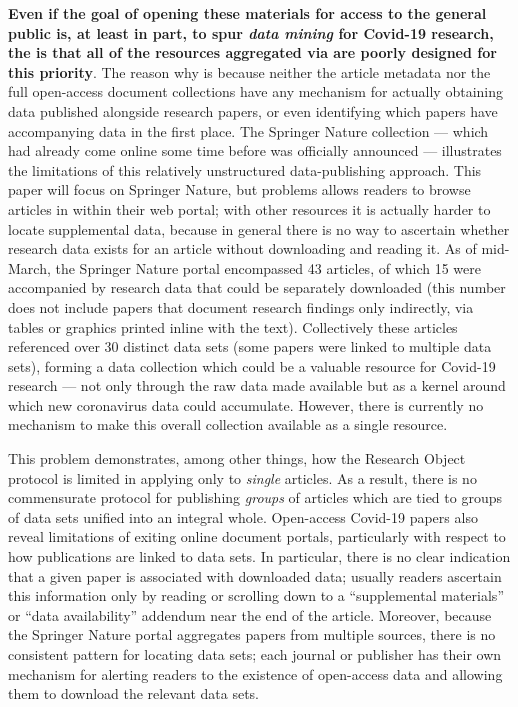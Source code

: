 \documentclass[11pt,letterpaper]{article}
\newcommand{\textscc}[1]{{\color{orr!35!black}{{%
						\fontfamily{Cabin-TLF}\fontseries{b}\selectfont{\textsc{\scriptsize{#1}}}}}}}
\newcommand{\AcronymText}[1]{{\textscc{#1}}}
\newcommand{\Cnineteen}{\resizebox{!}{7pt}{\AcronymText{CORD-19}}}
\newcommand{\HTML}{\resizebox{!}{7pt}{\AcronymText{HTML}}}
\newcommand{\p}[1]{

\vspace{.85em}#1}
\newcommand{\q}[1]{{\fontfamily{qcr}\selectfont ``}#1{\fontfamily{qcr}\selectfont ''}}
\begin{document}
{\p{\textbf{Even if the goal of opening these materials for 
access to the general public is, at least in part, 
to spur \textit{data mining} for Covid-19 research, 
the is that all of the resources aggregated via \Cnineteen{} are poorly designed for this priority}.  The reason why is because neither the article 
metadata nor the full open-access document collections have 
any mechanism for actually obtaining data published 
alongside research papers, or even identifying which papers 
have accompanying data in the first place.    The Springer 
Nature collection --- which had already come online 
some time before \Cnineteen{} was officially announced --- 
illustrates the limitations of this relatively unstructured 
data-publishing approach.  This paper will 
focus on Springer Nature, but problems 
allows readers to browse articles in \HTML{} within their 
web portal; with other \Cnineteen{} resources it is actually 
harder to locate supplemental data, because in general 
there is no way to ascertain whether research data 
exists for an article without downloading and reading 
it.  As of mid-March, the Springer Nature portal 
encompassed 43 articles, 
of which 15 were accompanied by research data that 
could be separately downloaded (this number does 
not include papers that document research 
findings only indirectly, via tables or graphics 
printed inline with the text).  Collectively 
these articles referenced over 30 distinct data 
sets (some papers were linked to multiple 
data sets), forming a data collection which could 
be a valuable resource for Covid-19 research --- 
not only through the raw data made available 
but as a kernel around which new coronavirus data 
could accumulate.  However, there is currently no 
mechanism to make this overall collection available 
as a single resource.}

\p{This problem demonstrates, among other things, 
how the Research Object protocol is limited in applying 
only to \textit{single} articles.  As a result, there is no 
commensurate protocol for publishing \textit{groups} 
of articles which are tied to groups of data sets unified 
into an integral whole.  Open-access Covid-19 papers also 
reveal limitations of exiting online document portals, 
particularly with respect to how publications are 
linked to data sets.  In particular, there is no clear indication that a 
given paper is associated with downloaded data; usually 
readers ascertain this information only by reading or 
scrolling down to a \q{supplemental materials} or 
\q{data availability} addendum near the end of the article.  
Moreover, because the Springer Nature portal aggregates 
papers from multiple sources, there is no consistent 
pattern for locating data sets; each journal or 
publisher has their own mechanism for alerting readers 
to the existence of open-access data and allowing them 
to download the relevant data sets.}

}
\end{document}
